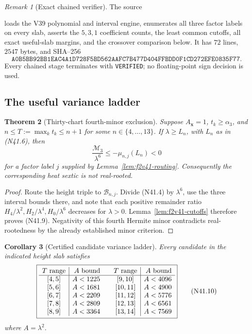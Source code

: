 \documentclass[11pt]{article}
\newtheorem{theorem}{Theorem}[section]
\newtheorem{corollary}[theorem]{Corollary}
\theoremstyle{definition}
\theoremstyle{remark}
\newtheorem{remark}[theorem]{Remark}
\begin{document}
\begin{remark}[Exact chained verifier]
\label{rem:f2v41-verifier}
The source
\begin{center}
\end{center}
loads the V39 polynomial and interval engine, enumerates all three factor
labels on every slab, asserts the \(5,3,1\) coefficient counts, the least
common cutoffs, all exact useful-slab margins, and the crossover
comparison below.  It has \(72\) lines, \(2547\) bytes, and SHA--256
\[
 \texttt{A0B5BB92BB1EAC4A1D728F5BD562AAFC}
 \allowbreak\texttt{7B477D404FFBDD0F1CD272EFE0835F77}.
\tag{N41.8}
\]
Every chained stage terminates with \texttt{VERIFIED}; no floating-point
sign decision is used.
\end{remark}

\subsection{The useful variance ladder}

\begin{theorem}[Thirty-chart fourth-minor exclusion]
\label{thm:f2v41-thirty-chart}
Suppose \(A_{\bm x}=1\), \(t_k\geq\alpha_3\), and
\(n\leq T:=\max_kt_k\leq n+1\) for some
\(n\in\{4,\ldots,13\}\).  If \(\lambda\geq L_n\), with \(L_n\) as in
\textup{(N41.6)}, then
\[
 \frac{\mathcal M_3}{\lambda^6}
 \leq-\mu_{n,j}(L_n)<0
\tag{N41.9}
\]
for a factor label \(j\) supplied by
Lemma~\ref{lem:f2v41-routing}.  Consequently the corresponding heat
sextic is not real-rooted.
\end{theorem}

\begin{proof}
Route the height triple to \(\mathcal B_{n,j}\).  Divide
\textup{(N41.4)} by \(\lambda^6\), use the three interval bounds there,
and note that each positive remainder ratio
\(H_4/\lambda^2,H_2/\lambda^4,H_0/\lambda^6\) decreases for
\(\lambda>0\).  Lemma~\ref{lem:f2v41-cutoffs} therefore proves
\textup{(N41.9)}.  Negativity of this fourth Hermite minor contradicts
real-rootedness by the already established minor criterion.
\end{proof}

\begin{corollary}[Certified candidate variance ladder]
\label{cor:f2v41-variance-ladder}
Every candidate in the indicated height slab satisfies
\[
\boxed{
\begin{array}{c|r@{\qquad}c|r}
T\text{ range}&A\text{ bound}&T\text{ range}&A\text{ bound}\\ \hline
{}[4,5]&A<1225&{}[9,10]&A<4096\\
{}[5,6]&A<1681&{}[10,11]&A<4900\\
{}[6,7]&A<2209&{}[11,12]&A<5776\\
{}[7,8]&A<2809&{}[12,13]&A<6561\\
{}[8,9]&A<3364&{}[13,14]&A<7569
\end{array}}
\tag{N41.10}
\]
where \(A=\lambda^2\).
\end{corollary}
\end{document}
